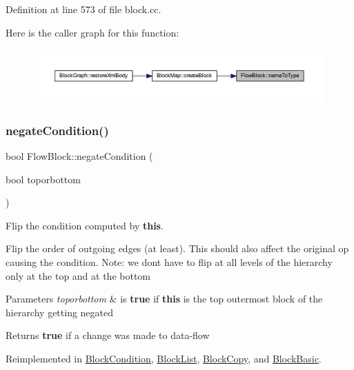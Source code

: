 Definition at line 573 of file block.\+cc.

Here is the caller graph for this function\+:
\nopagebreak
\begin{figure}[H]
\begin{center}
\leavevmode
\includegraphics[width=350pt]{class_flow_block_a0d80ab1ac96b718913a58b690357828b_icgraph}
\end{center}
\end{figure}
\mbox{\label{class_flow_block_ae0f8a479ae1548280ff0b4f45bc08dc3}} 
\subsubsection{\texorpdfstring{negateCondition()}{negateCondition()}}
{\footnotesize\ttfamily bool Flow\+Block\+::negate\+Condition (\begin{DoxyParamCaption}\item[{bool}]{toporbottom }\end{DoxyParamCaption})\hspace{0.3cm}{\ttfamily [virtual]}}



Flip the condition computed by {\bfseries{this}}. 

Flip the order of outgoing edges (at least). This should also affect the original op causing the condition. Note\+: we don\textquotesingle{}t have to flip at all levels of the hierarchy only at the top and at the bottom 
\begin{DoxyParams}{Parameters}
{\em toporbottom} & is {\bfseries{true}} if {\bfseries{this}} is the top outermost block of the hierarchy getting negated \\
\hline
\end{DoxyParams}
\begin{DoxyReturn}{Returns}
{\bfseries{true}} if a change was made to data-\/flow 
\end{DoxyReturn}


Reimplemented in \mbox{\hyperlink{class_block_condition_a2af1221f54ea05c5c8b25b4321f60705}{Block\+Condition}}, \mbox{\hyperlink{class_block_list_a97202688e117da20c82ef225318536ca}{Block\+List}}, \mbox{\hyperlink{class_block_copy_ad31f116ca37dd1ba235f0642365cf4f4}{Block\+Copy}}, and \mbox{\hyperlink{class_block_basic_aa15eaf687397a3b73da57abbb061a04c}{Block\+Basic}}.



